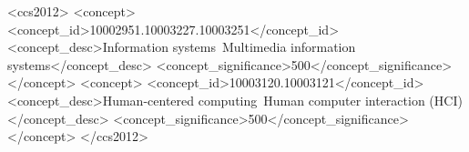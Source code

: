 \documentclass[sigconf, screen, review]{acmart}
\begin{document}
\begin{abstract}
% 

\end{abstract}

\begin{CCSXML}
<ccs2012>
   <concept>
       <concept_id>10002951.10003227.10003251</concept_id>
       <concept_desc>Information systems~Multimedia information systems</concept_desc>
       <concept_significance>500</concept_significance>
       </concept>
   <concept>
       <concept_id>10003120.10003121</concept_id>
       <concept_desc>Human-centered computing~Human computer interaction (HCI)</concept_desc>
       <concept_significance>500</concept_significance>
       </concept>
 </ccs2012>
\end{CCSXML}
\end{document}
